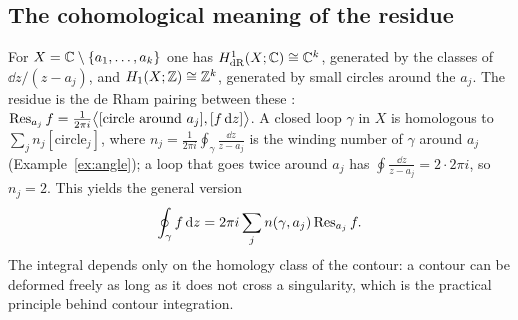 \subsection{The cohomological meaning of the residue}\label{sec:rescohom}

For $X=\mathbb{C}\setminus\{a_1,\dots,a_k\}$ one has $H^1_{\mathrm{dR}}(X;\mathbb{C})\cong\mathbb{C}^k$, generated by the classes of $\dd z/(z-a_j)$, and $H_1(X;\mathbb{Z})\cong\mathbb{Z}^k$, generated by small circles around the $a_j$. The residue is the de Rham pairing between these \cite{BottTu}:
$\operatorname{Res}_{a_j}f=\frac1{2\pi i}\bigl\langle[\text{circle around }a_j],[f\,\mathrm{d} z]\bigr\rangle$.
A closed loop $\gamma$ in $X$ is homologous to $\sum_jn_j[\text{circle}_j]$, where $n_j=\frac1{2\pi i}\oint_\gamma\frac{\dd z}{z-a_j}$ is the winding number of $\gamma$ around $a_j$ (Example~\ref{ex:angle}); \eg a loop that goes twice around $a_j$ has $\oint\frac{\dd z}{z-a_j}=2\cdot2\pi i$, so $n_j=2$. This yields the general version
\begin{equation}\label{eq:winding}
\oint_\gamma f\,\dd z=2\pi i\sum_jn(\gamma,a_j)\Res_{a_j}f .
\end{equation}
The integral depends only on the homology class of the contour: a contour can be deformed freely as long as it does not cross a singularity, which is the practical principle behind contour integration.
